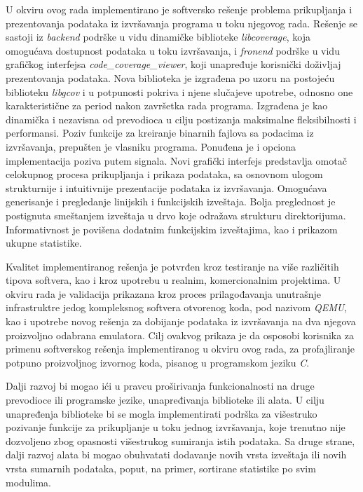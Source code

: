 \documentclass[12pt,oneside]{memoir}
\newcommand{\strano}[1]{\textit{#1}}
\begin{document}
U okviru ovog rada implementirano je softversko rešenje problema prikupljanja i prezentovanja podataka iz izvršavanja programa u toku njegovog rada. 
Rešenje se sastoji iz \strano{backend} podrške u vidu dinamičke biblioteke \strano{libcoverage}, koja omogućava dostupnost podataka u toku izvršavanja, i \strano{fronend} podrške u vidu grafičkog interfejsa \strano{code\_coverage\_viewer}, koji unapređuje korisnički doživljaj prezentovanja podataka. Nova biblioteka je izgrađena po uzoru na postojeću biblioteku \strano{libgcov} i u potpunosti pokriva i njene slučajeve upotrebe, odnosno one karakteristične za period nakon završetka rada programa. Izgrađena je kao dinamička i nezavisna od prevodioca u cilju postizanja maksimalne fleksibilnosti i performansi. Poziv funkcije za kreiranje binarnih fajlova sa podacima iz izvršavanja, prepušten je vlasniku programa. Ponuđena je i opciona implementacija poziva putem signala. Novi grafički interfejs predstavlja omotač celokupnog procesa prikupljanja i prikaza podataka, sa osnovnom ulogom strukturnije i intuitivnije prezentacije podataka iz izvršavanja. Omogućava generisanje i pregledanje linijskih i funkcijskih izveštaja. Bolja preglednost je postignuta smeštanjem izveštaja u drvo koje odražava strukturu direktorijuma. Informativnost je povišena dodatnim funkcijskim izveštajima, kao i prikazom ukupne statistike. 

Kvalitet implementiranog rešenja je potvrđen kroz testiranje na više različitih tipova softvera, kao i kroz upotrebu u realnim, komercionalnim projektima. U okviru rada je validacija prikazana kroz proces prilagođavanja unutrašnje infrastruktre jedog kompleksnog softvera otvorenog koda, pod nazivom \strano{QEMU}, kao i upotrebe novog rešenja za dobijanje podataka iz izvršavanja na dva njegova proizvoljno odabrana emulatora. Cilj ovakvog prikaza je da osposobi korisnika za primenu softverskog rešenja implementiranog u okviru ovog rada, za profajliranje potpuno proizvoljnog izvornog koda, pisanog u programskom jeziku \strano{C}.

Dalji razvoj bi mogao ići u pravcu proširivanja funkcionalnosti na druge prevodioce ili programske jezike, unapređivanja biblioteke ili alata. U cilju unapređenja biblioteke bi se mogla implementirati podrška za višestruko pozivanje funkcije za prikupljanje u toku jednog izvršavanja, koje trenutno nije dozvoljeno zbog opasnosti višestrukog sumiranja istih podataka. Sa druge strane, dalji razvoj alata bi mogao obuhvatati dodavanje novih vrsta izveštaja ili novih vrsta sumarnih podataka, poput, na primer, sortirane statistike po svim modulima.
\end{document}
